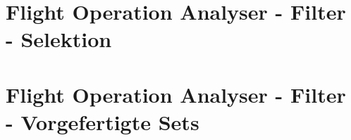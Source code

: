\begin{appendices}
\begin{figure}[h]
\end{figure}
\newpage



\section{Flight Operation Analyser - Filter - Selektion}
\label{appendix:foa_filter_2}

\begin{figure}[h]
\end{figure}
\newpage


\section{Flight Operation Analyser - Filter - Vorgefertigte Sets}
\label{appendix:foa_filter_3}

\begin{figure}[h]
\end{figure}
\newpage


\end{appendices}